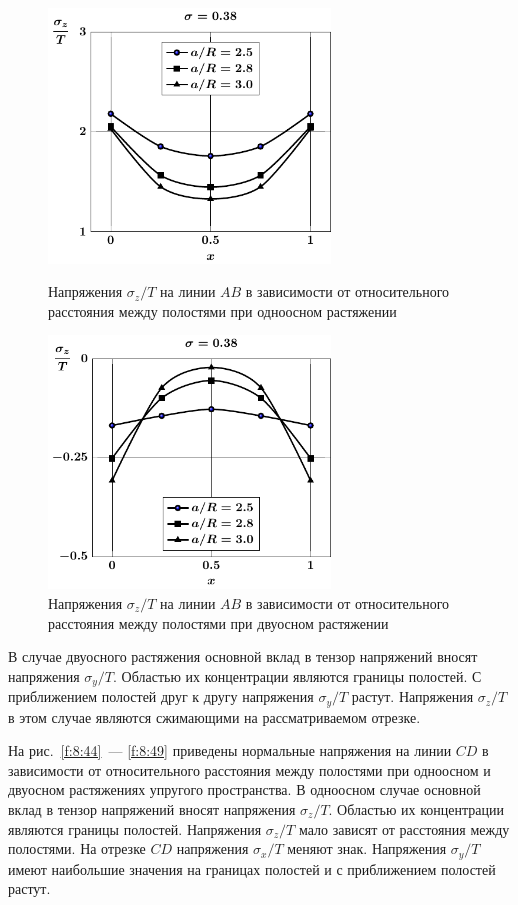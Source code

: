 \begin{figure}[h!]
\centering\footnotesize
\parbox[b]{7.5cm}{\centering\includegraphics[width=7.5cm]{spheres-cav13-a-t1-sig_z.pdf}
\caption{Напряжения $\sigma_z/T$ на линии $AB$ в зависимости от относительного расстояния между полостями при одноосном растяжении
\label{f:8:42}}}\hfil\hfil
\parbox[b]{7.5cm}{\centering\includegraphics[width=7.5cm]{spheres-cav13-a-t2-sig_z.pdf}
\caption{Напряжения $\sigma_z/T$ на линии $AB$ в зависимости от относительного расстояния между полостями при двуосном растяжении
\label{f:8:43}}}
\end{figure}

В случае двуосного растяжения основной вклад в тензор напряжений вносят напряжения $\sigma_y/T$. Областью их концентрации являются границы полостей. С приближением полостей друг к другу напряжения $\sigma_y/T$ растут. Напряжения $\sigma_z/T$ в этом случае являются сжимающими на рассматриваемом отрезке.

На рис.~\ref{f:8:44}~--- \ref{f:8:49} приведены нормальные напряжения на линии $CD$ в зависимости от относительного расстояния между полостями при одноосном и двуосном растяжениях упругого пространства. В одноосном случае основной вклад в тензор напряжений вносят напряжения $\sigma_z/T$. Областью их концентрации являются границы полостей. Напряжения $\sigma_z/T$ мало зависят от расстояния между полостями. На отрезке $CD$ напряжения $\sigma_x/T$ меняют знак. Напряжения $\sigma_y/T$ имеют наибольшие значения на границах полостей и с приближением полостей растут.

